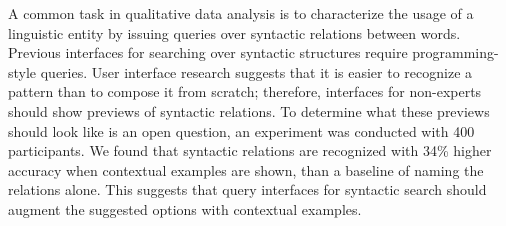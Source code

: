 
A common task in qualitative data analysis is to characterize the usage of a linguistic entity by issuing queries over syntactic relations between words.
Previous interfaces for  searching over syntactic structures require programming-style queries. User interface research suggests that it is easier to recognize a pattern than to compose it from scratch; therefore, interfaces for non-experts should show previews of syntactic relations.  To determine what these previews should look like is an open question, an experiment was conducted with  400 participants.  We found that syntactic relations are recognized with 34\% higher accuracy when contextual examples are shown, than a baseline of naming the relations alone.  This suggests that  query interfaces for syntactic search should augment the suggested options with contextual examples.
